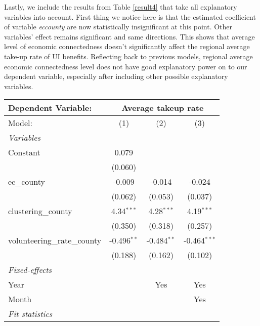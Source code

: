 \documentclass{article}
\begin{document}
Lastly, we include the results from Table \ref{result4} that take all explanatory variables into account. First thing we notice here is that the estimated coefficient of variable \textit{ec\textunderscore county} are now statistically insignificant at this point. Other variables' effect remains significant and same directions. This shows that average level of economic connectedness doesn't significantly affect the regional average take-up rate of UI benefits. Reflecting back to previous models, regional average economic connectedness level does not have good explanatory power on to our dependent variable, especially after including other possible explanatory variables.

    
\begin{table}[h!]
   \centering
   \begin{tabular}{lccc}
      \tabularnewline \midrule \midrule
      Dependent Variable:  & \multicolumn{3}{c}{Average takeup rate}\\
      \hline
      Model:                       & (1)            & (2)            & (3)\\  
      \midrule
      \emph{Variables}\\
      Constant                     & 0.079          &                &   \\   
                                   & (0.060)        &                &   \\   
      ec\_county                   & -0.009         & -0.014         & -0.024\\   
                                   & (0.062)        & (0.053)        & (0.037)\\   
      clustering\_county           & 4.34$^{***}$   & 4.28$^{***}$   & 4.19$^{***}$\\   
                                   & (0.350)        & (0.318)        & (0.257)\\   
      volunteering\_rate\_county   & -0.496$^{**}$ & -0.484$^{**}$ & -0.464$^{***}$\\   
                                   & (0.188)        & (0.162)        & (0.102)\\   
      \midrule
      \emph{Fixed-effects}\\
      Year                         &                & Yes            & Yes\\  
      Month                        &                &                & Yes\\  
      \midrule
      \emph{Fit statistics}\\

\end{tabular}
\end{table}
\end{document}
